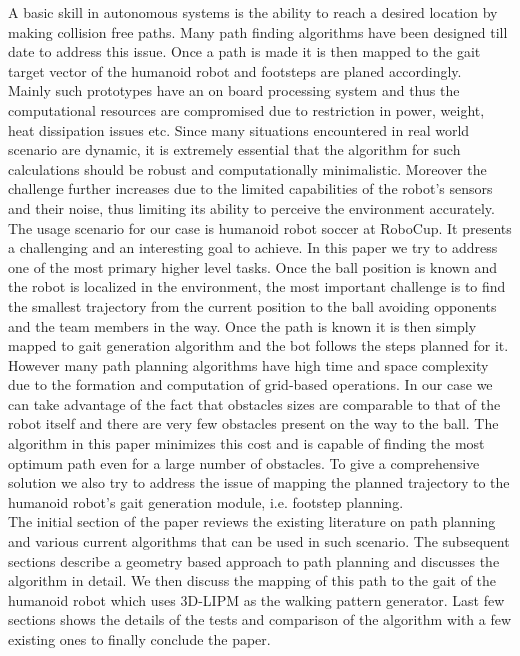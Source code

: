 \documentclass[letterpaper, 10 pt, conference]{ieeeconf}  %
\begin{document}
A basic skill in autonomous systems is the ability to reach a desired location by making collision free paths. Many path finding algorithms have been designed till date to address this issue. Once a path is made it is then mapped to the gait target vector of the humanoid robot and footsteps are planed accordingly. \\
Mainly such prototypes have an on board processing system and thus the computational resources are compromised due to restriction in power, weight, heat dissipation issues etc. Since many situations encountered in real world scenario are dynamic, it is extremely essential that the algorithm for such calculations should be robust and computationally minimalistic. Moreover the challenge further increases due to the limited capabilities of the robot's sensors and their noise, thus limiting its ability to perceive the environment accurately.\\
The usage scenario for our case is humanoid robot soccer at RoboCup. It presents a challenging and an interesting goal to achieve. In this paper we try to address one of the most primary higher level tasks. Once the ball position is known and the robot is localized in the environment, the most important challenge is to find the smallest trajectory from the current position to the ball avoiding opponents and the team members in the way. Once the path is known it is then simply mapped to gait generation algorithm and the bot follows the steps planned for it.\\
However many path planning algorithms have high time and space complexity due to the formation and computation of grid-based operations. In our case we can take advantage of the fact that obstacles sizes are comparable to that of the robot itself and there are very few obstacles present on the way to the ball. The algorithm in this paper minimizes this cost and is capable of finding the most optimum path even for a large number of obstacles. To give a comprehensive solution we also try to address the issue of mapping the planned trajectory to the humanoid robot's gait generation module, i.e. footstep planning.\\
The initial section of the paper reviews the existing literature on path planning and various current algorithms that can be used in such scenario. The subsequent sections describe a geometry based approach to path planning and discusses the algorithm in detail. We then discuss the mapping of this path to the gait of the humanoid robot which uses 3D-LIPM as the walking pattern generator. Last few sections shows the details of the tests and comparison of the algorithm with a few existing ones to finally conclude the paper.
\end{document}
